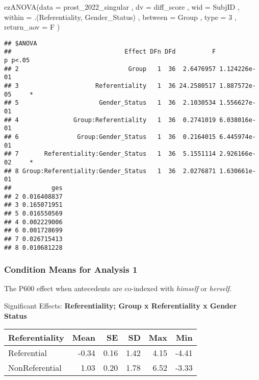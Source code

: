 \documentclass[
]{article}
\newenvironment{Shaded}{\begin{snugshade}}{\end{snugshade}}
\newcommand{\AttributeTok}[1]{\textcolor[rgb]{0.77,0.63,0.00}{#1}}
\newcommand{\DecValTok}[1]{\textcolor[rgb]{0.00,0.00,0.81}{#1}}
\newcommand{\FunctionTok}[1]{\textcolor[rgb]{0.00,0.00,0.00}{#1}}
\newcommand{\NormalTok}[1]{#1}
\begin{document}
\begin{Shaded}
\begin{Highlighting}[]
\FunctionTok{ezANOVA}\NormalTok{(}\AttributeTok{data =}\NormalTok{ prost\_2022\_singular}
\NormalTok{              , }\AttributeTok{dv =}\NormalTok{ diff\_score}
\NormalTok{              , }\AttributeTok{wid =}\NormalTok{ SubjID}
\NormalTok{              , }\AttributeTok{within =}\NormalTok{ .(Referentiality, Gender\_Status)}
\NormalTok{              , }\AttributeTok{between =}\NormalTok{ Group}
\NormalTok{              , }\AttributeTok{type =} \DecValTok{3}
\NormalTok{              , }\AttributeTok{return\_aov =}\NormalTok{ F}
\NormalTok{              )}
\end{Highlighting}
\end{Shaded}

\begin{verbatim}
## $ANOVA
##                               Effect DFn DFd          F            p p<.05
## 2                              Group   1  36  2.6476957 1.124226e-01      
## 3                     Referentiality   1  36 24.2580517 1.887572e-05     *
## 5                      Gender_Status   1  36  2.1030534 1.556627e-01      
## 4               Group:Referentiality   1  36  0.2741019 6.038016e-01      
## 6                Group:Gender_Status   1  36  0.2164015 6.445974e-01      
## 7       Referentiality:Gender_Status   1  36  5.1551114 2.926166e-02     *
## 8 Group:Referentiality:Gender_Status   1  36  2.0276871 1.630661e-01      
##           ges
## 2 0.016408837
## 3 0.165071951
## 5 0.016550569
## 4 0.002229006
## 6 0.001728699
## 7 0.026715413
## 8 0.010681228
\end{verbatim}

\hypertarget{condition-means-for-analysis-1}{%
\subsubsection{Condition Means for Analysis
1}\label{condition-means-for-analysis-1}}

The P600 effect when antecedents are co-indexed with \emph{himself} or
\emph{herself}.

Significant Effects: \textbf{Referentiality; Group x Referentiality x
Gender Status}

\begin{longtable}[]{@{}lrrrrr@{}}
\toprule()
Referentiality & Mean & SE & SD & Max & Min \\
\midrule()
\endhead
Referential & -0.34 & 0.16 & 1.42 & 4.15 & -4.41 \\
NonReferential & 1.03 & 0.20 & 1.78 & 6.52 & -3.33 \\
\bottomrule()
\end{longtable}
\end{document}
